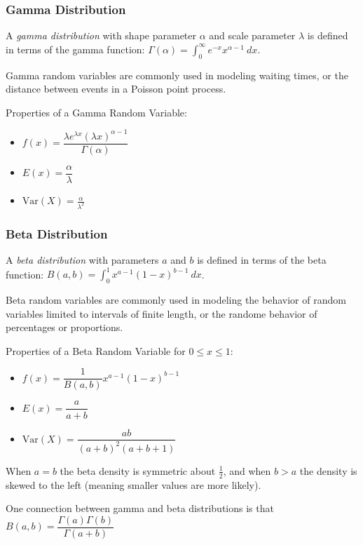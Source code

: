 \documentclass[10pt]{article}
\begin{document}
		\subsubsection*{Gamma Distribution}
		A \emph{gamma distribution} with shape parameter \(\alpha\) and scale parameter \(\lambda\) is defined in terms of the gamma function: \(\Gamma(\alpha)=\displaystyle\int_{0}^{\infty}e^{-x}x^{\alpha-1}\: dx\). 
		
		Gamma random variables are commonly used in modeling waiting times, or the distance between events in a Poisson point process.
		
		Properties of a Gamma Random Variable:
		\begin{multicols}{3}
			\begin{itemize}
				\item $f(x) = \dfrac{\lambda e^{\lambda x}(\lambda x)^{\alpha - 1}}{\Gamma(\alpha)}$
				\item $E(x) = \dfrac{\alpha}{\lambda}$
				\item $\text{Var}(X) = \frac{\alpha}{\lambda^2}$
			\end{itemize}
		\end{multicols}
		
		\subsubsection*{Beta Distribution}
		A \emph{beta distribution} with parameters \(a\) and \(b\) is defined in terms of the beta function: \(B(a,b)=\displaystyle\int_{0}^{1}x^{a-1}(1-x)^{b-1}\: dx\). 
		
		Beta random variables are commonly used in modeling the behavior of random variables limited to intervals of finite length, or the randome behavior of percentages or proportions.
		
		Properties of a Beta Random Variable for \(0 \leq x \leq 1\):
		\begin{multicols}{3}
			\begin{itemize}
				\item $f(x) = \dfrac{1}{B(a,b)}x^{a-1}(1-x)^{b-1}$
				\item $E(x) = \dfrac{a}{a+b}$
				\item $\text{Var}(X) = \dfrac{ab}{(a+b)^2(a+b+1)}$
			\end{itemize}
		\end{multicols}
		When \(a=b\) the beta density is symmetric about \(\frac{1}{2}\), and when \(b>a\) the density is skewed to the left (meaning smaller values are more likely).
		
		One connection between gamma and beta distributions is that \(B(a,b)=\dfrac{\Gamma(a)\Gamma(b)}{\Gamma(a+b)}\)
\end{document}
